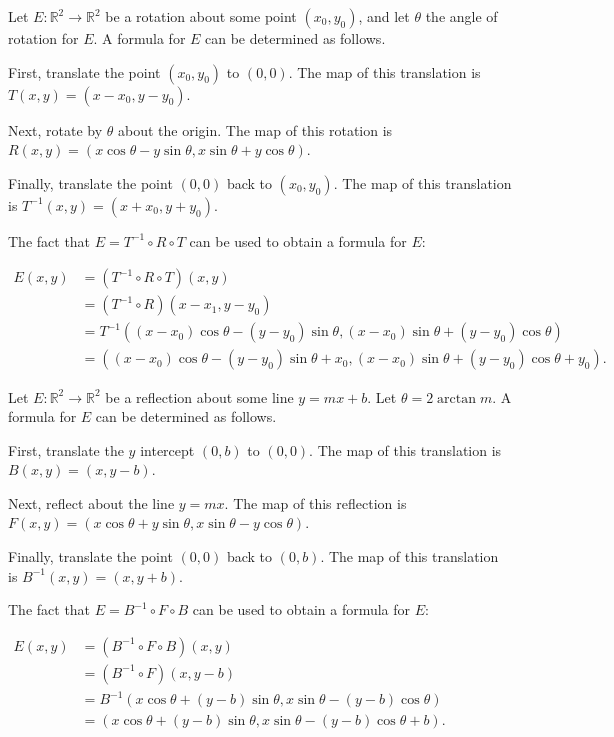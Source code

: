\documentclass[12pt]{article}
\begin{document}

Let $E \colon \mathbb{R}^2 \to \mathbb{R}^2$ be a rotation about some point $(x_0,y_0)$, and let $\theta$ the angle of rotation for $E$.  A formula for $E$ can be determined as follows.

First, translate the point $(x_0,y_0)$ to $(0,0)$.  The map of this translation is $T(x,y)=(x-x_0,y-y_0)$.

Next, rotate by $\theta$ about the origin.  The map of this rotation is $R(x,y)=(x\cos\theta-y\sin\theta,x\sin\theta+y\cos\theta)$.

Finally, translate the point $(0,0)$ back to $(x_0,y_0)$.  The map of this translation is $T^{-1}(x,y)=(x+x_0,y+y_0)$.

The fact that $E=T^{-1} \circ R \circ T$ can be used to obtain a formula for $E$:

\begin{center}
$\begin{array}{rl}
E(x,y) & =(T^{-1} \circ R \circ T)(x,y) \\
& =(T^{-1} \circ R)(x-x_1,y-y_0) \\
& =T^{-1}((x-x_0)\cos\theta-(y-y_0)\sin\theta,(x-x_0)\sin\theta+(y-y_0)\cos\theta) \\
& =((x-x_0)\cos\theta-(y-y_0)\sin\theta+x_0,(x-x_0)\sin\theta+(y-y_0)\cos\theta+y_0). \end{array}$
\end{center}

Let $E \colon \mathbb{R}^2 \to \mathbb{R}^2$ be a reflection about some line $y=mx+b$.  Let $\theta=2\arctan m$.  A formula for $E$ can be determined as follows.

First, translate the $y$ intercept $(0,b)$ to $(0,0)$.  The map of this translation is $B(x,y)=(x,y-b)$.

Next, reflect about the line $y=mx$.  The map of this reflection is $F(x,y)=(x\cos\theta+y\sin\theta,x\sin\theta-y\cos\theta)$.

Finally, translate the point $(0,0)$ back to $(0,b)$.  The map of this translation is $B^{-1}(x,y)=(x,y+b)$.

The fact that $E=B^{-1} \circ F \circ B$ can be used to obtain a formula for $E$:

\begin{center}
$\begin{array}{rl}
E(x,y) & =(B^{-1} \circ F \circ B)(x,y) \\
& =(B^{-1} \circ F)(x,y-b) \\
& =B^{-1}(x\cos\theta+(y-b)\sin\theta,x\sin\theta-(y-b)\cos\theta) \\
& =(x\cos\theta+(y-b)\sin\theta,x\sin\theta-(y-b)\cos\theta+b). \end{array}$
\end{center}
\end{document}
